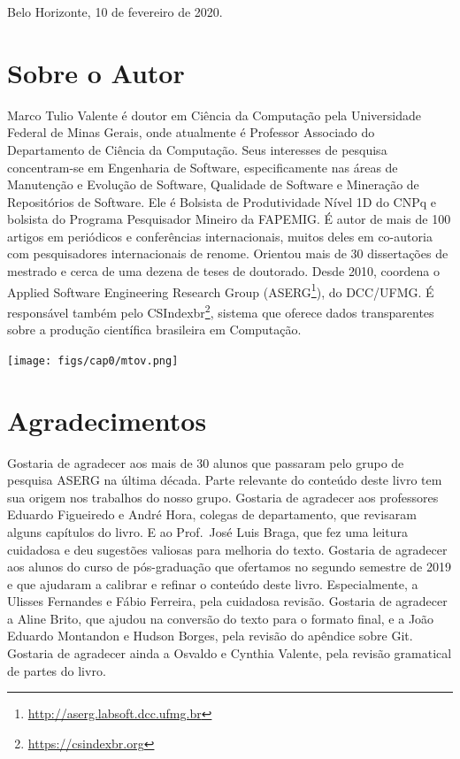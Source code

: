 \documentclass[
  11pt,
  twoside]{book}
\DeclareRobustCommand{\href}[2]{#2\footnote{\url{#1}}}
\begin{document}
Belo Horizonte, 10 de fevereiro de 2020.

\newpage

\hypertarget{sobre-o-autor}{%
\section*{Sobre o Autor}\label{sobre-o-autor}}

Marco Tulio Valente é doutor em Ciência da Computação pela Universidade
Federal de Minas Gerais, onde atualmente é Professor Associado do
Departamento de Ciência da Computação. Seus interesses de pesquisa
concentram-se em Engenharia de Software, especificamente nas áreas de
Manutenção e Evolução de Software, Qualidade de Software e Mineração de
Repositórios de Software. Ele é Bolsista de Produtividade Nível 1D do
CNPq e bolsista do Programa Pesquisador Mineiro da FAPEMIG. É autor de
mais de 100 artigos em periódicos e conferências internacionais, muitos
deles em co-autoria com pesquisadores internacionais de renome. Orientou
mais de 30 dissertações de mestrado e cerca de uma dezena de teses de
doutorado. Desde 2010, coordena o Applied Software Engineering Research
Group (\href{http://aserg.labsoft.dcc.ufmg.br}{ASERG}), do DCC/UFMG. É
responsável também pelo \href{https://csindexbr.org}{CSIndexbr}, sistema
que oferece dados transparentes sobre a produção científica brasileira
em Computação.

\texttt{[image: figs/cap0/mtov.png]}

\hypertarget{agradecimentos}{%
\section*{Agradecimentos}\label{agradecimentos}}

Gostaria de agradecer aos mais de 30 alunos que passaram pelo grupo de
pesquisa ASERG na última década. Parte relevante do conteúdo deste livro
tem sua origem nos trabalhos do nosso grupo. Gostaria de agradecer aos
professores Eduardo Figueiredo e André Hora, colegas de departamento,
que revisaram alguns capítulos do livro. E ao Prof.~José Luis Braga, que
fez uma leitura cuidadosa e deu sugestões valiosas para melhoria do
texto. Gostaria de agradecer aos alunos do curso de pós-graduação que
ofertamos no segundo semestre de 2019 e que ajudaram a calibrar e
refinar o conteúdo deste livro. Especialmente, a Ulisses Fernandes e
Fábio Ferreira, pela cuidadosa revisão. Gostaria de agradecer a Aline
Brito, que ajudou na conversão do texto para o formato final, e a João
Eduardo Montandon e Hudson Borges, pela revisão do apêndice sobre Git.
Gostaria de agradecer ainda a Osvaldo e Cynthia Valente, pela revisão
gramatical de partes do livro.
\end{document}
